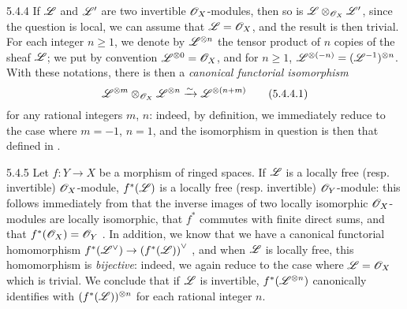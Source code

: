 \begin{env}{5.4.4}
\label{env-0.5.4.4}
If $\mathscr{L}$ and $\mathscr{L}'$ are two invertible $\mathscr{O}_X$-modules, then so is
$\mathscr{L}\otimes_{\mathscr{O}_X}\mathscr{L}'$, since the question is local, we can assume that
$\mathscr{L}=\mathscr{O}_X$, and the result is then trivial. For each integer $n\geqslant 1$,
we denote by $\mathscr{L}^{\otimes n}$ the tensor product of $n$ copies of the sheaf
$\mathscr{L}$; we put by convention $\mathscr{L}^{\otimes 0}=\mathscr{O}_X$, and for
$n\geqslant 1$, $\mathscr{L}^{\otimes(-n)}=(\mathscr{L}^{-1})^{\otimes n}$. With these
notations, there is then a \emph{canonical functorial isomorphism}
\[
  \mathscr{L}^{\otimes m}\otimes_{\mathscr{O}_X}\mathscr{L}^{\otimes n}\xrightarrow{\sim}\mathscr{L}^{\otimes(n+m)}
  \tag{5.4.4.1}
\]
for any rational integers $m$, $n$: indeed, by definition, we immediately reduce
to the case where $m=-1$, $n=1$, and the isomorphism in question is then that
defined in .
\end{env}

\begin{env}{5.4.5}
\label{env-0.5.4.5}
Let $f:Y\to X$ be a morphism of ringed spaces. If $\mathscr{L}$ is a locally free
(resp. invertible) $\mathscr{O}_X$-module, $f^*(\mathscr{L})$ is a locally free
(resp. invertible) $\mathscr{O}_Y$-module: this follows immediately from that the
inverse images of two locally isomorphic $\mathscr{O}_X$-modules are locally isomorphic,
that $f^*$ commutes with finite direct sums, and that $f^*(\mathscr{O}_X)=\mathscr{O}_Y$
. In addition, we know that we have a canonical functorial
homomorphism $f^*({\mathscr{L}}^\vee)\to{(f^*(\mathscr{L}))}^\vee$ , and
when $\mathscr{L}$ is locally free, this homomorphism is \emph{bijective}: indeed, we
again reduce to the case where $\mathscr{L}=\mathscr{O}_X$ which is trivial. We conclude that
if $\mathscr{L}$ is invertible, $f^*(\mathscr{L}^{\otimes n})$ canonically identifies with
$(f^*(\mathscr{L}))^{\otimes n}$ for each rational integer $n$.
\end{env}

